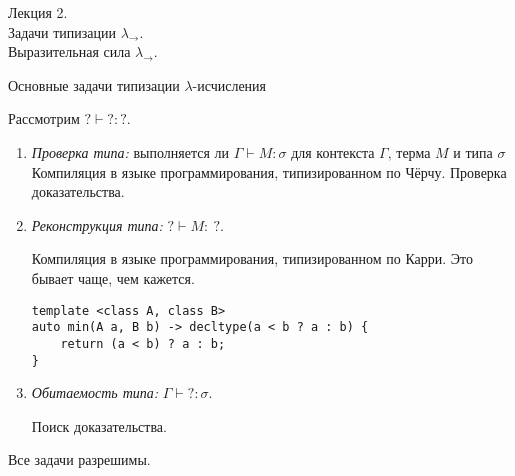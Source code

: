 \documentclass[aspectratio=169]{beamer}
\begin{document}
\newtheorem{dfn}{Определение}[section]
\newtheorem{nte}{Замечание}[section]

\newtheorem{axiom}{Аксиома}[section]
\newtheorem{thm}{Теорема}[section]
\newtheorem{lmm}[theorem]{Лемма}
\newtheorem{statement}{Утверждение}[section]
\newtheorem{oun_paragraph}{Пункт}[section]
\newtheorem{cons}{Следствие}[section]
\newtheorem*{exm}{Пример}

\newcommand{\comb}[1]{\operatorname{\bf{\textrm{#1}}}}
\newcommand{\func}[1]{\operatorname{#1}}
\newcommand{\reduction}[1]{{\color{OrangeRed}#1}}
\newcommand{\set}[1]{\left\{#1\right\}}

\def\from#1{\par \parbox{0.7\textwidth}{\par \hfill\raggedleft \it #1}} 

\begin{frame}{}
\begin{center}\Large Лекция 2.\\ \Large Задачи типизации $\lambda_\rightarrow$. \\Выразительная сила $\lambda_\rightarrow$.\end{center}
\end{frame}

\begin{frame}[fragile]{Основные задачи типизации $\lambda$-исчисления}

Рассмотрим $? \vdash ? : ?$.

		\begin{enumerate}
			\item \emph{Проверка типа:} выполняется ли $\Gamma\vdash M:\sigma$ для контекста $\Gamma\text{, терма }M\text{ и типа }\sigma$\\

{\color{gray}Компиляция в языке программирования, типизированном по Чёрчу. Проверка доказательства.}
			\item \emph{Реконструкция типа:} $?\vdash M:\:?$.

{\color{gray}Компиляция в языке программирования, типизированном по Карри. Это бывает чаще, чем кажется.}

\verb!template <class A, class B>!\\
\verb!auto min(A a, B b) -> decltype(a < b ? a : b) {!\\
\verb!    return (a < b) ? a : b;!\\
\verb!}!

			\item \emph{Обитаемость типа:} $\Gamma\vdash ?:\sigma$.

{\color{gray}Поиск доказательства.}
		\end{enumerate}
Все задачи разрешимы.
\end{frame}
\end{document}
